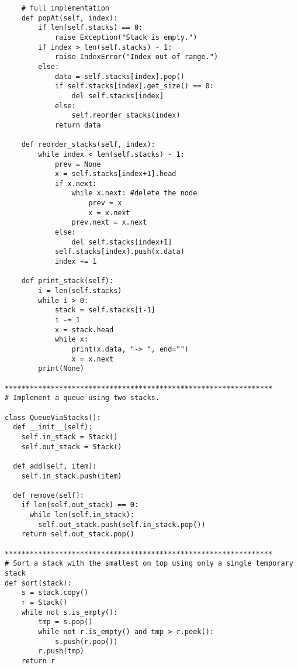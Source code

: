 \documentclass[12pt]{article}
\begin{document}
\begin{lstlisting}
    # full implementation
    def popAt(self, index):
        if len(self.stacks) == 0:
            raise Exception("Stack is empty.")
        if index > len(self.stacks) - 1:
            raise IndexError("Index out of range.")
        else:
            data = self.stacks[index].pop()
            if self.stacks[index].get_size() == 0:
                del self.stacks[index]
            else:
                self.reorder_stacks(index)
            return data

    def reorder_stacks(self, index):
        while index < len(self.stacks) - 1:
            prev = None
            x = self.stacks[index+1].head
            if x.next:
                while x.next: #delete the node
                    prev = x
                    x = x.next
                prev.next = x.next
            else:
                del self.stacks[index+1]
            self.stacks[index].push(x.data)
            index += 1

    def print_stack(self):
        i = len(self.stacks)
        while i > 0:
            stack = self.stacks[i-1]
            i -= 1
            x = stack.head
            while x:
                print(x.data, "-> ", end="")
                x = x.next
        print(None)

****************************************************************
# Implement a queue using two stacks.

class QueueViaStacks():
  def __init__(self):
    self.in_stack = Stack()
    self.out_stack = Stack()
  
  def add(self, item):
    self.in_stack.push(item)
    
  def remove(self):
    if len(self.out_stack) == 0:
      while len(self.in_stack):
        self.out_stack.push(self.in_stack.pop())
    return self.out_stack.pop()

****************************************************************
# Sort a stack with the smallest on top using only a single temporary stack
def sort(stack):
    s = stack.copy()
    r = Stack()
    while not s.is_empty():
        tmp = s.pop()
        while not r.is_empty() and tmp > r.peek():
            s.push(r.pop())
        r.push(tmp)
    return r


\end{lstlisting}
\end{document}
